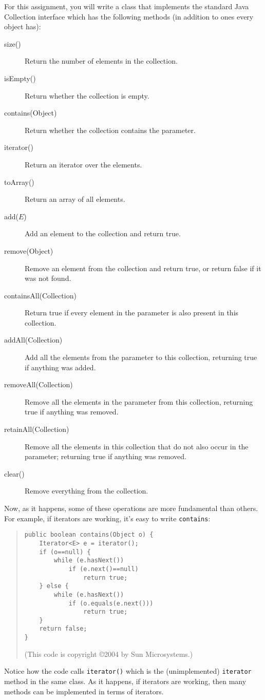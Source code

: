 For this assignment, you will write a class that implements
the standard Java Collection interface which has the following
methods (in addition to ones every object has):
\begin{description}
    \item[size()] Return the number of elements in the collection.
    \item[isEmpty()] Return whether the collection is empty.
    \item[contains(Object)] Return whether the collection contains the parameter.
    \item[iterator()] Return an iterator over the elements.
    \item[toArray()] Return an array of all elements.
    \item[add($E$)] Add an element to the collection and return true.
    \item[remove(Object)] Remove an element from the collection and
      return true, or return false if it was not found.
    \item[containsAll(Collection)] Return true if every element in the
      parameter is also present in this collection.
    \item[addAll(Collection)] Add all the elements from the parameter
      to this collection, returning true if anything was added.
    \item[removeAll(Collection)] Remove all the elements in the parameter
      from this collection, returning true if anything was removed.
    \item[retainAll(Collection)] Remove all the elements in this
      collection that do not also occur in the parameter; returning
      true if anything was removed.
    \item[clear()] Remove everything from the collection.
\end{description}
\pagebreak
Now, as it happens, some of these operations are more fundamental than
others.  For example, if iterators are working, it's easy to write
\verb|contains|:
\begin{quote}
\begin{verbatim}
public boolean contains(Object o) {
    Iterator<E> e = iterator();
    if (o==null) {
        while (e.hasNext())
            if (e.next()==null)
                return true;
    } else {
        while (e.hasNext())
            if (o.equals(e.next()))
                return true;
    }
    return false;
}
\end{verbatim}
(This code is copyright \copyright 2004 by Sun Microsystems.)
\end{quote}
Notice how the code calls \verb|iterator()| which is the
(unimplemented) \verb|iterator| method in the same class.
As it happens, if iterators are working, then many methods can be
implemented in terms of iterators.

